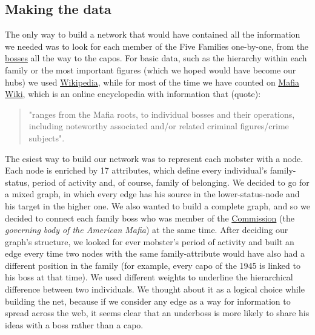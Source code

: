 \documentclass{article}
\begin{document}
\subsection*{\textcolor{Titoli}{Making the data}}
The only way to build a network that would have contained all the information we needed was to look for each member of the Five Families one-by-one, from the \href{https://en.wikipedia.org/wiki/Crime_boss}{bosses} all the way to the capos. For basic data, such as the hierarchy within each family or the most important figures (which we hoped would have become our hubs) we used \href{https://en.wikipedia.org/wiki/Main_Page}{Wikipedia}, while for most of the time we have counted on \href{https://mafia.wikia.org/wiki/Mafia_Wiki}{Mafia Wiki}, which is an online encyclopedia with information that (quote): \begin{quote}"ranges from the Mafia roots, to individual bosses and their operations, including noteworthy associated and/or related criminal figures/crime subjects".\end{quote}
The esiest way to build our network was to represent each mobster with a node. Each node is enriched by 17 attributes, which define every individual's family-status, period of activity and, of course, family of belonging. We decided to go for a mixed graph, in which every edge has his source in the lower-status-node and his target in the higher one. We also wanted to build a complete graph, and so we decided to connect each family boss who was member of the \href{https://en.wikipedia.org/wiki/The_Commission_(American_Mafia)}{Commission} (the \textit{governing body of the American Mafia}) at the same time. After deciding our graph's structure, we looked for ever mobster's period of activity and built an edge every time two nodes with the same family-attribute would have also had a different position in the family (for example, every capo of the 1945 is linked to his boss at that time). We used different weights to underline the hierarchical difference between two individuals. We thought about it as a logical choice while building the net, because if we consider any edge as a way for information to spread across the web, it seems clear that an underboss is more likely to share his ideas with a boss rather than a capo.
\vspace{30pt}
\end{document}
